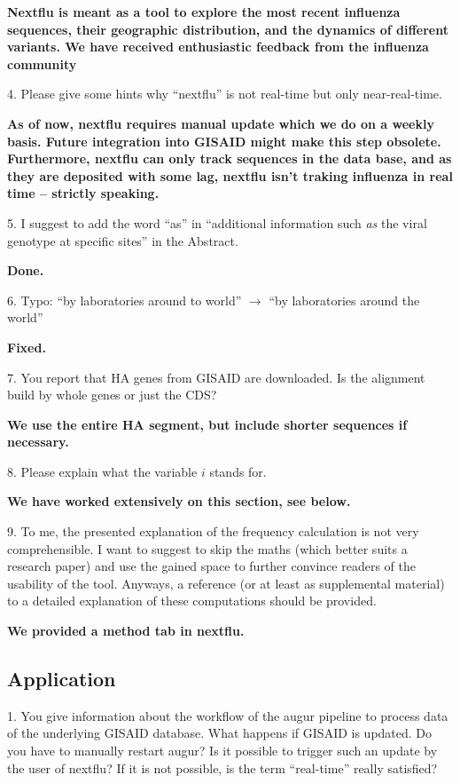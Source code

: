 \documentclass[11pt,oneside,letterpaper]{article}
\begin{document}
{\bf Nextflu is meant as a tool to explore the most recent influenza sequences, their geographic distribution, and the dynamics of different variants. We have received enthusiastic feedback from the influenza community}

4. Please give some hints why ``nextflu'' is not real-time but only near-real-time.

{\bf As of now, nextflu requires manual update which we do on a weekly basis. Future integration into GISAID might make this step obsolete. Furthermore, nextflu can only track sequences in the data base, and as they are deposited with some lag, nextflu isn't traking influenza in real time -- strictly speaking.}

5. I suggest to add the word ``as'' in ``additional information such \textit{as} the viral genotype at specific sites'' in the Abstract.

\textbf{Done.}

6. Typo: ``by laboratories around to world'' $\rightarrow$ ``by laboratories around the world''

\textbf{Fixed.}

7. You report that HA genes from GISAID are downloaded. Is the alignment build by whole genes or just the CDS?

{\bf We use the entire HA segment, but include shorter sequences if necessary.}

8. Please explain what the variable $i$ stands for.

{\bf We have worked extensively on this section, see below.}

9. To me, the presented explanation of the frequency calculation is not very comprehensible. I want to suggest to skip the maths (which better suits a research paper) and use the gained space to further convince readers of the usability of the tool. Anyways, a reference (or at least as supplemental material) to a detailed explanation of these computations should be provided.

{\bf We provided a method tab in nextflu.}

\subsection*{Application}

1. You give information about the workflow of the augur pipeline to process data of the underlying GISAID database. What happens if GISAID is updated. Do you have to manually restart augur? Is it possible to trigger such an update by the user of nextflu? If it is not possible, is the term ``real-time'' really satisfied?
\end{document}
